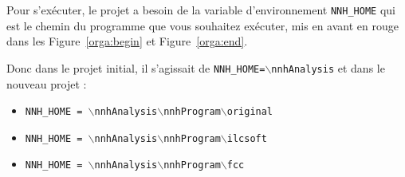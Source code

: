 \documentclass[10pt,a4paper]{report}
\begin{document}
\begin{appendix}
Pour s'exécuter, le projet a besoin de la variable d'environnement \texttt{NNH\_HOME} qui est le chemin du programme que vous souhaitez exécuter,  mis en avant en rouge dans les Figure~\ref{orga:begin} et Figure~\ref{orga:end}.

Donc dans le projet initial, il s'agissait de \texttt{NNH\_HOME=$\backslash$nnhAnalysis} et dans le nouveau projet :
\begin{itemize}
	\item \texttt{NNH\_HOME = $\backslash$nnhAnalysis$\backslash$nnhProgram$\backslash$original}
	\item \texttt{NNH\_HOME = $\backslash$nnhAnalysis$\backslash$nnhProgram$\backslash$ilcsoft}
	\item \texttt{NNH\_HOME = $\backslash$nnhAnalysis$\backslash$nnhProgram$\backslash$fcc}
\end{itemize}


\end{appendix}


\listoffigures


%



\nocite{*} %


\end{document}
